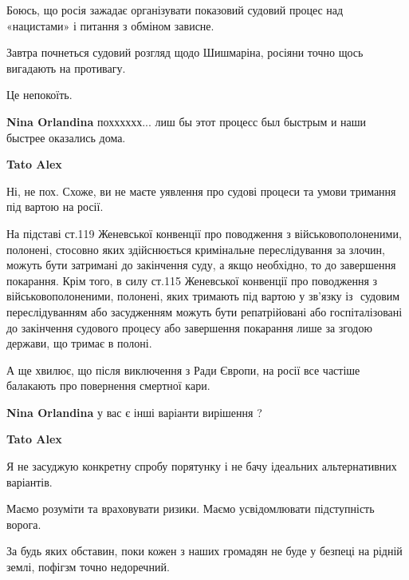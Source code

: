  
 
 
 
 
\qqSecCmt

\begin{itemize} %

Боюсь, що росія зажадає організувати показовий судовий процес над «нацистами» і
питання з обміном зависне.

Завтра почнеться судовий розгляд щодо Шишмаріна, росіяни точно щось вигадають
на противагу.

Це непокоїть.

\begin{itemize} %
\textbf{Nina Orlandina} похххххх... лиш бы этот процесс был быстрым и наши быстрее оказались дома.

\textbf{Tato Alex} 

Ні, не пох. Схоже, ви не маєте уявлення про судові процеси та умови тримання під вартою на росії.

На підставі ст.119 Женевської конвенції про поводження з військовополоненими,
полонені, стосовно яких здійснюється кримінальне переслідування за злочин,
можуть бути затримані до закінчення суду, а якщо необхідно, то до завершення
покарання. Крім того, в силу ст.115 Женевської конвенції про поводження з
військовополоненими, полонені, яких тримають під вартою у зв'язку із  судовим
переслідуванням або засудженням можуть бути репатрійовані або госпіталізовані
до закінчення судового процесу або завершення покарання лише за згодою держави,
що тримає в полоні.

А ще хвилює, що після виключення з Ради Європи, на росії все частіше балакають
про повернення смертної кари.

\textbf{Nina Orlandina} у вас є інші варіанти вирішення ?

\textbf{Tato Alex} 

Я не засуджую конкретну спробу порятунку і не бачу ідеальних альтернативних
варіантів.

Маємо розуміти та враховувати ризики. Маємо усвідомлювати підступність ворога.

За будь яких обставин, поки кожен з наших громадян не буде у безпеці на рідній
землі, пофігзм точно недоречний.


\end{itemize}
\end{itemize}
